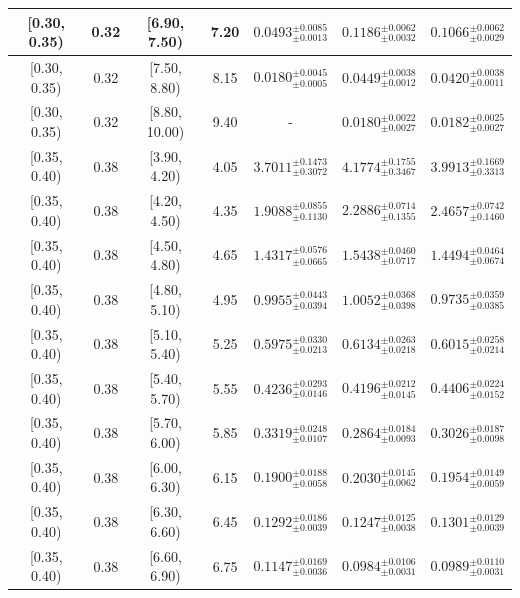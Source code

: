 \begin{longtable}{|c|c|c|c|c|c|c|}
[0.30, 0.35) & 0.32 & [6.90, 7.50) & 7.20 & $0.0493^{ \pm 0.0085 }_{ \pm 0.0013 }$ & $0.1186^{ \pm 0.0062 }_{ \pm 0.0032 }$ & $0.1066^{ \pm 0.0062 }_{ \pm 0.0029 }$ \\ 
\hline
[0.30, 0.35) & 0.32 & [7.50, 8.80) & 8.15 & $0.0180^{ \pm 0.0045 }_{ \pm 0.0005 }$ & $0.0449^{ \pm 0.0038 }_{ \pm 0.0012 }$ & $0.0420^{ \pm 0.0038 }_{ \pm 0.0011 }$ \\ 
\hline
[0.30, 0.35) & 0.32 & [8.80, 10.00) & 9.40 & - & $0.0180^{ \pm 0.0022 }_{ \pm 0.0027 }$ & $0.0182^{ \pm 0.0025 }_{ \pm 0.0027 }$ \\ 
\hline
[0.35, 0.40) & 0.38 & [3.90, 4.20) & 4.05 & $3.7011^{ \pm 0.1473 }_{ \pm 0.3072 }$ & $4.1774^{ \pm 0.1755 }_{ \pm 0.3467 }$ & $3.9913^{ \pm 0.1669 }_{ \pm 0.3313 }$ \\ 
\hline
[0.35, 0.40) & 0.38 & [4.20, 4.50) & 4.35 & $1.9088^{ \pm 0.0855 }_{ \pm 0.1130 }$ & $2.2886^{ \pm 0.0714 }_{ \pm 0.1355 }$ & $2.4657^{ \pm 0.0742 }_{ \pm 0.1460 }$ \\ 
\hline
[0.35, 0.40) & 0.38 & [4.50, 4.80) & 4.65 & $1.4317^{ \pm 0.0576 }_{ \pm 0.0665 }$ & $1.5438^{ \pm 0.0460 }_{ \pm 0.0717 }$ & $1.4494^{ \pm 0.0464 }_{ \pm 0.0674 }$ \\ 
\hline
[0.35, 0.40) & 0.38 & [4.80, 5.10) & 4.95 & $0.9955^{ \pm 0.0443 }_{ \pm 0.0394 }$ & $1.0052^{ \pm 0.0368 }_{ \pm 0.0398 }$ & $0.9735^{ \pm 0.0359 }_{ \pm 0.0385 }$ \\ 
\hline
[0.35, 0.40) & 0.38 & [5.10, 5.40) & 5.25 & $0.5975^{ \pm 0.0330 }_{ \pm 0.0213 }$ & $0.6134^{ \pm 0.0263 }_{ \pm 0.0218 }$ & $0.6015^{ \pm 0.0258 }_{ \pm 0.0214 }$ \\ 
\hline
[0.35, 0.40) & 0.38 & [5.40, 5.70) & 5.55 & $0.4236^{ \pm 0.0293 }_{ \pm 0.0146 }$ & $0.4196^{ \pm 0.0212 }_{ \pm 0.0145 }$ & $0.4406^{ \pm 0.0224 }_{ \pm 0.0152 }$ \\ 
\hline
[0.35, 0.40) & 0.38 & [5.70, 6.00) & 5.85 & $0.3319^{ \pm 0.0248 }_{ \pm 0.0107 }$ & $0.2864^{ \pm 0.0184 }_{ \pm 0.0093 }$ & $0.3026^{ \pm 0.0187 }_{ \pm 0.0098 }$ \\ 
\hline
[0.35, 0.40) & 0.38 & [6.00, 6.30) & 6.15 & $0.1900^{ \pm 0.0188 }_{ \pm 0.0058 }$ & $0.2030^{ \pm 0.0145 }_{ \pm 0.0062 }$ & $0.1954^{ \pm 0.0149 }_{ \pm 0.0059 }$ \\ 
\hline
[0.35, 0.40) & 0.38 & [6.30, 6.60) & 6.45 & $0.1292^{ \pm 0.0186 }_{ \pm 0.0039 }$ & $0.1247^{ \pm 0.0125 }_{ \pm 0.0038 }$ & $0.1301^{ \pm 0.0129 }_{ \pm 0.0039 }$ \\ 
\hline
[0.35, 0.40) & 0.38 & [6.60, 6.90) & 6.75 & $0.1147^{ \pm 0.0169 }_{ \pm 0.0036 }$ & $0.0984^{ \pm 0.0106 }_{ \pm 0.0031 }$ & $0.0989^{ \pm 0.0110 }_{ \pm 0.0031 }$ \\ 

\end{longtable}
